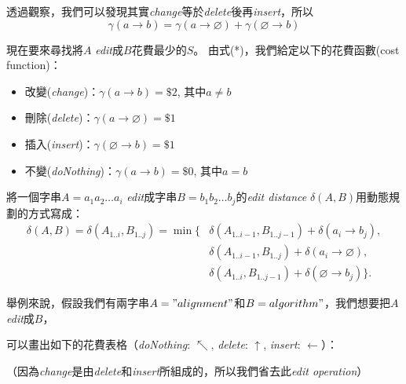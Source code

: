 \documentclass[15pt]{extarticle}
\begin{document}

透過觀察，我們可以發現其實\textit{change}等於\textit{delete}後再\textit{insert}，所以
\[\gamma(a\to b)=\gamma(a\to\varnothing)+\gamma(\varnothing\to b)\tag{*}
\]

現在要來尋找將$A$ \textit{edit}成$B$花費最少的$S$。
由式(*)，我們給定以下的花費函數(cost function)：

\begin{itemize}
    \item 改變(\textit{change})：$\gamma(a\to b)=\$2$, 其中$a\ne b$
    \item 刪除(\textit{delete})：$\gamma(a\to\varnothing)=\$1$
    \item 插入(\textit{insert})：$\gamma(\varnothing\to b)=\$1$
    \item 不變(\textit{doNothing})：$\gamma(a\to b)=\$0$, 其中$a=b$
\end{itemize}

將一個字串$A=a_1a_2\dots a_i$ \textit{edit}成字串$B=b_1b_2\dots b_j$的\textit{edit distance} $\delta(A,B)$用動態規劃的方式寫成：
\begin{align*}
    \delta(A,B)=\delta(A_{1..i},B_{1..j}) = \min\{& \delta(A_{1..i-1},B_{1..j-1})+\delta(a_i\to b_j), \\
    & \delta(A_{1..i-1},B_{1..j})+\delta(a_i\to\varnothing), \\
    & \delta(A_{1..i},B_{1..j-1})+\delta(\varnothing\to b_j)\}.
\end{align*}

舉例來說，假設我們有兩字串$A="alignment"$和$B=
algorithm"$，我們想要把$A$ \textit{edit}成$B$，

可以畫出如下的花費表格（\textit{doNothing}: $\nwarrow$, \textit{delete}: $\uparrow$, \textit{insert}: $\leftarrow$）：

（因為\textit{change}是由\textit{delete}和\textit{insert}所組成的，所以我們省去此\textit{edit operation}）
\end{document}
